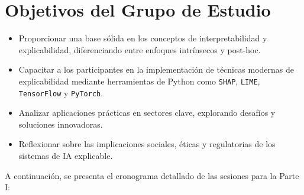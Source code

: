 \section*{Objetivos del Grupo de Estudio}
\begin{itemize}
    \item Proporcionar una base sólida en los conceptos de interpretabilidad y explicabilidad, diferenciando entre enfoques intrínsecos y post-hoc.
    \item Capacitar a los participantes en la implementación de técnicas modernas de explicabilidad mediante herramientas de Python como \texttt{SHAP}, \texttt{LIME}, \texttt{TensorFlow} y \texttt{PyTorch}.
    \item Analizar aplicaciones prácticas en sectores clave, explorando desafíos y soluciones innovadoras.
    \item Reflexionar sobre las implicaciones sociales, éticas y regulatorias de los sistemas de IA explicable.
\end{itemize}

A continuación, se presenta el cronograma detallado de las sesiones para la Parte I:

